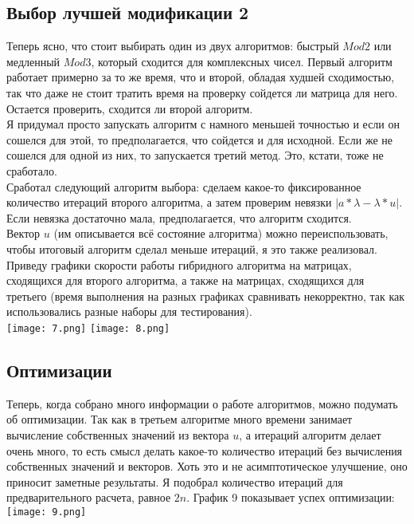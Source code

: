 \documentclass[a4paper,12pt,fleqn]{article}
\begin{document}
\subsection{Выбор лучшей модификации 2}
Теперь ясно, что стоит выбирать один из двух алгоритмов: быстрый $Mod 2$ или медленный $Mod 3$, который сходится для комплексных чисел. Первый алгоритм работает примерно за то же время, что и второй, обладая худшей сходимостью, так что даже не стоит тратить время на проверку сойдется ли матрица для него. Остается проверить, сходится ли второй алгоритм.\\
Я придумал просто запускать алгоритм с намного меньшей точностью и если он сошелся для этой, то предполагается, что сойдется и для исходной. Если же не сошелся для одной из них, то запускается третий метод. Это, кстати, тоже не сработало. \\
Сработал следующий алгоритм выбора: сделаем какое-то фиксированное количество итераций второго алгоритма, а затем проверим невязки $|a * \lambda - \lambda * u|$. Если невязка достаточно мала, предполагается, что алгоритм сходится. \\
Вектор $u$ (им описывается всё состояние алгоритма) можно переиспользовать, чтобы итоговый алгоритм сделал меньше итераций, я это также реализовал.\\
Приведу графики скорости работы гибридного алгоритма на матрицах, сходящихся для второго алгоритма, а также на матрицах, сходящихся для третьего (время выполнения на разных графиках сравнивать некорректно, так как использовались разные наборы для тестирования).\\
\texttt{[image: 7.png]}
\texttt{[image: 8.png]}\\


\subsection{Оптимизации}
Теперь, когда собрано много информации о работе алгоритмов, можно подумать об оптимизации. Так как в третьем алгоритме много времени занимает вычисление собственных значений из вектора $u$, а итераций алгоритм делает очень много, то есть смысл делать какое-то количество итераций без вычисления собственных значений и векторов. Хоть это и не асимптотическое улучшение, оно приносит заметные результаты. Я подобрал количество итераций для предварительного расчета, равное $2n$. График 9 показывает успех оптимизации:\\
\texttt{[image: 9.png]}\\
\end{document}
